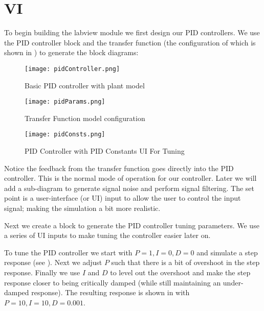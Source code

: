 \documentclass[main.tex]{subfile}
\begin{document}
\section{\Labview VI} 
\label{sec:labview_vi}

To begin building the labview module we first design our PID controllers. We use
the PID controller block and the transfer function (the configuration of which 
is shown in ) to generate the block diagrams:

\begin{figure}[h]
	\begin{center}
		\texttt{[image: pidController.png]}
	\end{center}
	\caption{Basic PID controller with plant model}
	\label{fig:pidController}
\end{figure}

\begin{figure}[h]
	\begin{center}
		\texttt{[image: pidParams.png]}
	\end{center}
	\caption{Transfer Function model configuration}
	\label{fig:pidParams}
\end{figure}

\begin{figure}[h]
	\begin{center}
		\texttt{[image: pidConsts.png]}
	\end{center}
	\caption{PID Controller with PID Constants UI For Tuning}
	\label{fig:pidConsts}
\end{figure}


Notice the feedback from the transfer function goes directly into the PID
controller. This is the normal mode of operation for our controller. Later we
will add a sub-diagram to generate signal noise and perform signal filtering. The
set point is a user-interface (or UI) input to allow the user to control the
input signal; making the simulation a bit more realistic.

Next we create a block to generate the PID controller tuning parameters. We use
a series of UI inputs to make tuning the controller easier later on.

To tune the PID controller we start with $P=1, I=0, D=0$ and simulate a step
response (see ).  Next we adjust $P$ such that there is a bit
of overshoot in the step response. Finally we use $I$ and $D$ to level out the
overshoot and make the step response closer to being critically damped (while
still maintaining an under-damped response). The resulting response is shown in
 with $P=10, I=10, D=0.001$.
\end{document}
